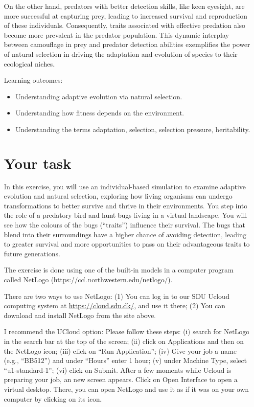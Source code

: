 \documentclass[
  a4paper]{book}
\providecommand{\tightlist}{%
  \setlength{\itemsep}{0pt}\setlength{\parskip}{0pt}}
\begin{document}
On the other hand, predators with better detection skills, like keen eyesight, are more successful at capturing prey, leading to increased survival and reproduction of these individuals. Consequently, traits associated with effective predation also become more prevalent in the predator population. This dynamic interplay between camouflage in prey and predator detection abilities exemplifies the power of natural selection in driving the adaptation and evolution of species to their ecological niches.

\begin{do-something}
Learning outcomes:

\begin{itemize}
\tightlist
\item
  Understanding adaptive evolution via natural selection.
\item
  Understanding how fitness depends on the environment.
\item
  Understanding the terms adaptation, selection, selection pressure,
  heritability.
\end{itemize}
\end{do-something}

\hypertarget{your-task}{%
\section{Your task}\label{your-task}}

In this exercise, you will use an individual-based simulation to examine adaptive evolution and natural selection, exploring how living organisms can undergo transformations to better survive and thrive in their environments. You step into the role of a predatory bird and hunt bugs living in a virtual landscape. You will see how the colours of the bugs (``traits'') influence their survival. The bugs that blend into their surroundings have a higher chance of avoiding detection, leading to greater survival and more opportunities to pass on their advantageous traits to future generations.

The exercise is done using one of the built-in models in a computer program called NetLogo (\url{https://ccl.northwestern.edu/netlogo/}).

There are two ways to use NetLogo: (1) You can log in to our SDU Ucloud computing system at \url{https://cloud.sdu.dk/}, and use it there; (2) You can download and install NetLogo from the site above.

I recommend the UCloud option: Please follow these steps: (i) search for NetLogo in the search bar at the top of the screen; (ii) click on Applications and then on the NetLogo icon; (iii) click on ``Run Application''; (iv) Give your job a name (e.g., ``BB512'') and under ``Hours'' enter 1 hour; (v) under Machine Type, select ``u1-standard-1''; (vi) click on Submit. After a few moments while Ucloud is preparing your job, an new screen appears. Click on Open Interface to open a virtual desktop. There, you can open NetLogo and use it as if it was on your own computer by clicking on its icon.
\end{document}
